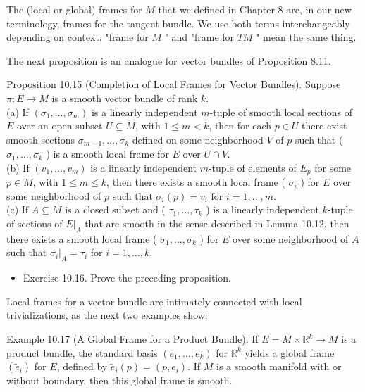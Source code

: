 \documentclass[10pt]{article}
\begin{document}
The (local or global) frames for $M$ that we defined in Chapter 8 are, in our new terminology, frames for the tangent bundle. We use both terms interchangeably depending on context: "frame for $M$ " and "frame for $T M$ " mean the same thing.

The next proposition is an analogue for vector bundles of Proposition 8.11.

Proposition 10.15 (Completion of Local Frames for Vector Bundles). Suppose $\pi: E \rightarrow M$ is a smooth vector bundle of rank $k$.\\
(a) If $\left(\sigma_{1}, \ldots, \sigma_{m}\right)$ is a linearly independent $m$-tuple of smooth local sections of $E$ over an open subset $U \subseteq M$, with $1 \leq m<k$, then for each $p \in U$ there exist smooth sections $\sigma_{m+1}, \ldots, \sigma_{k}$ defined on some neighborhood $V$ of $p$ such that ( $\sigma_{1}, \ldots, \sigma_{k}$ ) is a smooth local frame for $E$ over $U \cap V$.\\
(b) If $\left(v_{1}, \ldots, v_{m}\right)$ is a linearly independent $m$-tuple of elements of $E_{p}$ for some $p \in M$, with $1 \leq m \leq k$, then there exists a smooth local frame ( $\sigma_{i}$ ) for $E$ over some neighborhood of $p$ such that $\sigma_{i}(p)=v_{i}$ for $i=1, \ldots, m$.\\
(c) If $A \subseteq M$ is a closed subset and ( $\tau_{1}, \ldots, \tau_{k}$ ) is a linearly independent $k$-tuple of sections of $\left.E\right|_{A}$ that are smooth in the sense described in Lemma 10.12, then there exists a smooth local frame ( $\sigma_{1}, \ldots, \sigma_{k}$ ) for $E$ over some neighborhood of $A$ such that $\left.\sigma_{i}\right|_{A}=\tau_{i}$ for $i=1, \ldots, k$.

\begin{itemize}
  \item Exercise 10.16. Prove the preceding proposition.
\end{itemize}

Local frames for a vector bundle are intimately connected with local trivializations, as the next two examples show.

Example 10.17 (A Global Frame for a Product Bundle). If $E=M \times \mathbb{R}^{k} \rightarrow M$ is a product bundle, the standard basis $\left(e_{1}, \ldots, e_{k}\right)$ for $\mathbb{R}^{k}$ yields a global frame $\left(\tilde{e}_{i}\right)$ for $E$, defined by $\tilde{e}_{i}(p)=\left(p, e_{i}\right)$. If $M$ is a smooth manifold with or without boundary, then this global frame is smooth.
\end{document}

